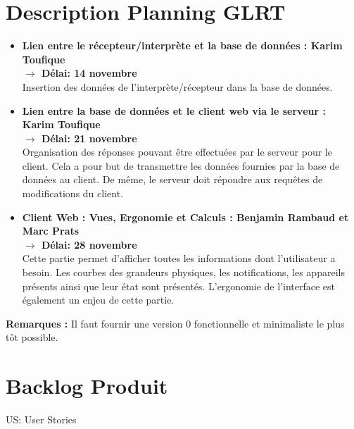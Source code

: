 \documentclass[10pt,a4paper]{article}
\begin{document}

\section{Description Planning GLRT}

\begin{itemize}[label=$\bullet$]
    \setlength\itemsep{1em}
    
    \item \textbf{ Lien entre le récepteur/interprète et la base de données : Karim Toufique
    \\ $\rightarrow$ Délai: 14 novembre}\\
    Insertion des données de l'interprète/récepteur dans la base de données. 
    
    \item \textbf{Lien entre la base de données et le client web via le serveur : Karim Toufique 
    \\$\rightarrow$ Délai: 21 novembre}\\
    Organisation des réponses pouvant être effectuées par le serveur pour le client. Cela a pour but de transmettre les données fournies par la base de données au client. De même, le serveur doit répondre aux requêtes de modifications du client.
    
    \item \textbf{Client Web : Vues, Ergonomie et Calculs : Benjamin Rambaud et Marc Prats 
    \\$\rightarrow$ Délai: 28 novembre}\\
    Cette partie permet d'afficher toutes les informations dont l'utilisateur a besoin. Les courbes des grandeurs physiques, les notifications, les appareils présents ainsi que leur état sont présentés. L'ergonomie de l'interface est également un enjeu de cette partie.  
\end{itemize}

\vspace{1em}
\textbf{Remarques :} Il faut fournir une version 0 fonctionnelle et minimaliste le plus tôt possible.


\section{Backlog Produit}

US: User Stories
\end{document}
